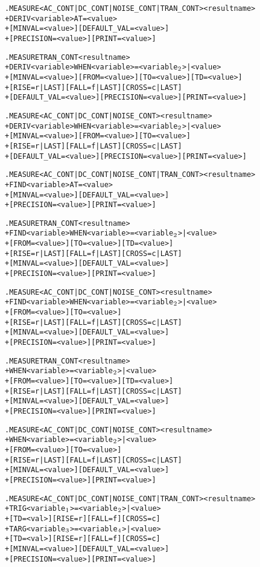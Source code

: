\begin{Command}
\format
\begin{alltt}
.MEASURE <AC_CONT|DC_CONT|NOISE_CONT|TRAN_CONT> <result name>
+ DERIV <variable> AT=<value>
+ [MINVAL=<value>] [DEFAULT_VAL=<value>]
+ [PRECISION=<value>] [PRINT=<value>]

.MEASURE TRAN_CONT <result name>
+ DERIV <variable> WHEN <variable>=<variable\(\sb{2}\)>|<value>
+ [MINVAL=<value>] [FROM=<value>] [TO=<value>] [TD=<value>]
+ [RISE=r|LAST] [FALL=f|LAST] [CROSS=c|LAST]
+ [DEFAULT_VAL=<value>] [PRECISION=<value>] [PRINT=<value>]

.MEASURE <AC_CONT|DC_CONT|NOISE_CONT> <result name>
+ DERIV <variable> WHEN <variable>=<variable\(\sb{2}\)>|<value>
+ [MINVAL=<value>] [FROM=<value>] [TO=<value>]
+ [RISE=r|LAST] [FALL=f|LAST] [CROSS=c|LAST]
+ [DEFAULT_VAL=<value>] [PRECISION=<value>] [PRINT=<value>]

.MEASURE <AC_CONT|DC_CONT|NOISE_CONT|TRAN_CONT> <result name>
+ FIND <variable> AT=<value>
+ [MINVAL=<value>] [DEFAULT_VAL=<value>]
+ [PRECISION=<value>] [PRINT=<value>]

.MEASURE TRAN_CONT <result name>
+ FIND <variable> WHEN <variable>=<variable\(\sb{2}\)>|<value>
+ [FROM=<value>] [TO=<value>] [TD=<value>]
+ [RISE=r|LAST] [FALL=f|LAST] [CROSS=c|LAST]
+ [MINVAL=<value>] [DEFAULT_VAL=<value>]
+ [PRECISION=<value>] [PRINT=<value>]

.MEASURE <AC_CONT|DC_CONT|NOISE_CONT> <result name>
+ FIND <variable> WHEN <variable>=<variable\(\sb{2}\)>|<value>
+ [FROM=<value>] [TO=<value>]
+ [RISE=r|LAST] [FALL=f|LAST] [CROSS=c|LAST]
+ [MINVAL=<value>] [DEFAULT_VAL=<value>]
+ [PRECISION=<value>] [PRINT=<value>]

.MEASURE TRAN_CONT <result name>
+ WHEN <variable>=<variable\(\sb{2}\)>|<value>
+ [FROM=<value>] [TO=<value>] [TD=<value>]
+ [RISE=r|LAST] [FALL=f|LAST] [CROSS=c|LAST]
+ [MINVAL=<value>] [DEFAULT_VAL=<value>]
+ [PRECISION=<value>] [PRINT=<value>]

.MEASURE <AC_CONT|DC_CONT|NOISE_CONT> <result name>
+ WHEN <variable>=<variable\(\sb{2}\)>|<value>
+ [FROM=<value>] [TO=<value>]
+ [RISE=r|LAST] [FALL=f|LAST] [CROSS=c|LAST]
+ [MINVAL=<value>] [DEFAULT_VAL=<value>]
+ [PRECISION=<value>] [PRINT=<value>]

.MEASURE <AC_CONT|DC_CONT|NOISE_CONT|TRAN_CONT> <result name>
+ TRIG <variable\(\sb{1}\)>=<variable\(\sb{2}\)>|<value> 
+ [TD=<val>] [RISE=r] [FALL=f] [CROSS=c]
+ TARG <variable\(\sb{3}\)>=<variable\(\sb{4}\)>|<value> 
+ [TD=<val>] [RISE=r] [FALL=f] [CROSS=c]
+ [MINVAL=<value>] [DEFAULT_VAL=<value>]
+ [PRECISION=<value>] [PRINT=<value>]


\end{alltt}
\end{Command}
